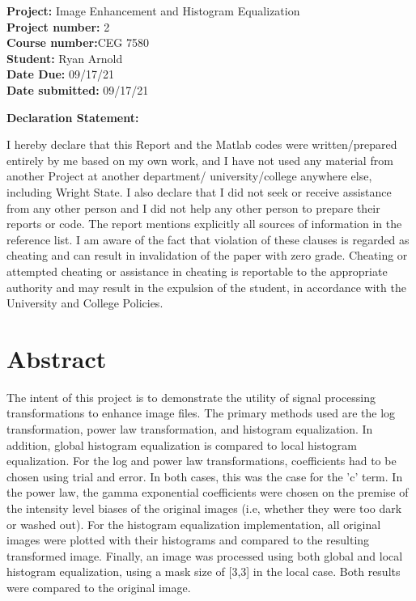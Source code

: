 \documentclass[./rarnold_report2.tex]{subfiles}
\begin{document}


\begin{titlepage}

\noindent
\textbf{Project:} Image Enhancement and Histogram Equalization \\
\textbf{Project number:} 2\\
\textbf{Course number:}CEG 7580\\
\textbf{Student:} Ryan Arnold \\
\textbf{Date Due:} 09/17/21 \\
\textbf{Date submitted:} 09/17/21
\vspace{24pt}

\noindent \textbf{Declaration Statement: }

\noindent I hereby declare that this Report and the Matlab codes were written/prepared entirely by me based on my own work, and I have not used any material from another Project at another department/ university/college anywhere else, including Wright State. I also declare that I did not seek or receive assistance from any other person and I did not help any other person to prepare their reports or code.  The report mentions explicitly all sources of information in the reference list. I am aware of the fact that violation of these clauses is regarded as cheating and can result in invalidation of the paper with zero grade. Cheating or attempted cheating or assistance in cheating is reportable to the appropriate authority and may result in the expulsion of the student, in accordance with the University and College Policies.

\end{titlepage}

\clearpage
\section*{Abstract}

\noindent The intent of this project is to demonstrate the utility of signal processing transformations to enhance image files.  The primary methods used are the log transformation, power law transformation, and histogram equalization.  In addition, global histogram equalization is compared to local histogram equalization.  For the log and power law transformations, coefficients had to be chosen using trial and error.  In both cases, this was the case for the 'c' term.  In the power law, the gamma exponential coefficients were chosen on the premise of the intensity level biases of the original images (i.e, whether they were too dark or washed out). For the histogram equalization implementation, all original images were plotted with their histograms and compared to the resulting transformed image.  Finally, an image was processed using both global and local histogram equalization, using a mask size of [3,3] in the local case.  Both results were compared to the original image.
\end{document}
